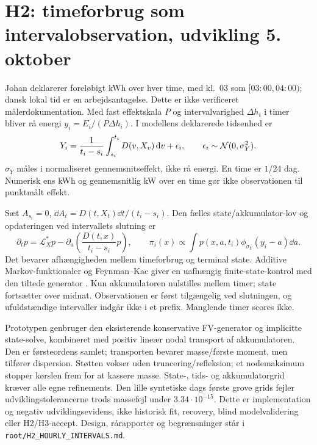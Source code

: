 \section{H2: timeforbrug som intervalobservation, udvikling 5. oktober}
Johan deklarerer foreløbigt kWh over hver time, med kl.~03 som
\([03{:}00,04{:}00)\); dansk lokal tid er en arbejdsantagelse.
Dette er ikke verificeret målerdokumentation. Med fast effektskala \(P\)
og intervalvarighed \(\Delta h_i\) i timer bliver rå energi
\(y_i=E_i/(P\Delta h_i)\). I modellens deklarerede tidsenhed er
\begin{equation}
 Y_i=\frac{1}{t_i-s_i}\int_{s_i}^{t_i}D(v,X_v)\,\mathrm d v+\epsilon_i,
 \qquad \epsilon_i\sim\mathcal N(0,\sigma_Y^2).
\end{equation}
\(\sigma_Y\) måles i normaliseret gennemsnitseffekt, ikke rå energi.
En time er \(1/24\) dag. Numerisk ens kWh og gennemsnitlig kW over en time
gør ikke observationen til punktmålt effekt.

Sæt \(A_{s_i}=0\), \(\dd A_t=D(t,X_t)\dd t/(t_i-s_i)\).
Den fælles state/akkumulator-lov og opdateringen ved intervallets slutning er
\begin{equation}
 \partial_t p=\mathcal L_X^*p-
 \partial_a\!\left(\frac{D(t,x)}{t_i-s_i}p\right),\qquad
 \pi_i(x)\propto\int p(x,a,t_i)\phi_{\sigma_Y}(y_i-a)\dd a.
\end{equation}
Det bevarer afhængigheden mellem timeforbrug og terminal state.
Additive Markov-funktionaler og Feynman--Kac giver en uafhængig
finite-state-kontrol med den tiltede generator \cite{feynmaninterval}.
Kun akkumulatoren nulstilles mellem timer; state fortsætter over midnat.
Observationen er først tilgængelig ved slutningen, og ufuldstændige intervaller
indgår ikke i et prefix. Manglende timer scores ikke.

Prototypen genbruger den eksisterende konservative FV-generator og implicitte
state-solve, kombineret med positiv lineær nodal transport af akkumulatoren.
Den er førsteordens samlet; transporten bevarer masse/første moment, men
tilfører dispersion. Støtten vokser uden truncering/refleksion; et nodemaksimum
stopper kørslen frem for at kassere masse. State-, tids- og akkumulatorgrid
kræver alle egne refinements. Den lille syntetiske dags første grove grids
fejler udviklingstolerancerne trods massefejl under \(3.34\cdot10^{-15}\).
Dette er implementation og negativ udviklingsevidens, ikke historisk fit,
recovery, blind modelvalidering eller H2/H3-accept. Design, rårapporter og
begrænsninger står i \texttt{root/H2\_HOURLY\_INTERVALS.md}.


